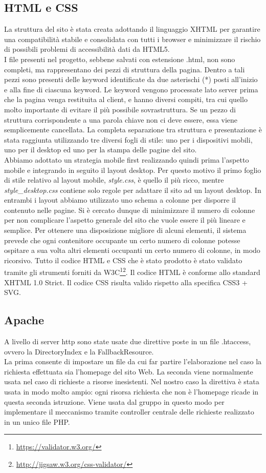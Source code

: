 \subsection{HTML e CSS}
La struttura del sito è stata creata adottando il linguaggio XHTML per garantire una compatibilità stabile e consolidata con tutti i browser e minimizzare il rischio di possibili problemi di accessibilità dati da HTML5.\\
I file presenti nel progetto, sebbene salvati con estensione .html, non sono completi, ma rappresentano dei pezzi di struttura della pagina. Dentro a tali pezzi sono presenti delle keyword identificate da due asterischi (*) posti all'inizio e alla fine di ciascuna keyword. Le keyword vengono processate lato server prima che la pagina venga restituita al client, e hanno diversi compiti, tra cui quello molto importante di evitare il più possibile sovrastruttura. Se un pezzo di struttura corrispondente a una parola chiave non ci deve essere, essa viene semplicemente cancellata.
La completa separazione tra struttura e presentazione è stata raggiunta utilizzando tre diversi fogli di stile: uno per i dispositivi mobili, uno per il desktop ed uno per la stampa delle pagine del sito.\\
 Abbiamo adottato un strategia mobile first realizzando quindi prima l'aspetto mobile e integrando in seguito il layout desktop. Per questo motivo il primo foglio di stile relativo al layout mobile, \textit{style.css}, è quello il più ricco, mentre \textit{style\_desktop.css} contiene solo regole per adattare il sito ad un layout desktop. In entrambi i layout abbiamo utilizzato uno schema a colonne per disporre il contenuto nelle pagine. Si è cercato dunque di minimizzare il numero di colonne per non complicare l'aspetto generale del sito che vuole essere il più lineare e semplice. Per ottenere una disposizione migliore di alcuni elementi, il sistema prevede che ogni contenitore occupante un certo numero di colonne potesse ospitare a sua volta altri elementi occupanti un certo numero di colonne, in modo ricorsivo.
Tutto il codice HTML e CSS che è stato prodotto è stato validato tramite gli strumenti forniti da W3C\footnote{\url{https://validator.w3.org/}}\footnote{\url{http://jigsaw.w3.org/css-validator/}}. Il codice HTML è conforme allo standard XHTML 1.0 Strict. Il codice CSS risulta valido rispetto alla specifica CSS3 + SVG.

\subsection{Apache}
A livello di server http sono state usate due direttive poste in un file .htaccess, ovvero la DirectoryIndex e la FallbackResource.\\
La prima consente di impostare un file da cui far partire l'elaborazione nel caso la richiesta effettuata sia l'homepage del sito Web.
La seconda viene normalmente usata nel caso di richieste a risorse inesistenti.
Nel nostro caso la direttiva è stata usata in modo molto ampio: ogni risorsa richiesta che non è l'homepage ricade in questa seconda istruzione.
Viene usata dal gruppo in questo modo per implementare il meccanismo tramite controller centrale delle richieste realizzato in un unico file PHP.

